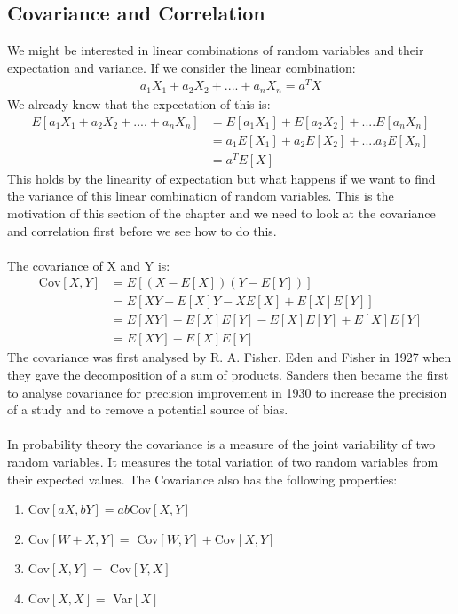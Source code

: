 \documentclass[,oneside]{article}
\begin{document}
\begin{enumerate}
\subsection{Covariance and Correlation}
We might be interested in linear combinations of random variables and their expectation and variance. If we consider the linear combination:
\begin{align*}
a_1 X_1 + a_2 X_2 +....+a_n X_n = a^T X
\end{align*}
We already know that the expectation of this is:
\begin{align*}
E[a_1 X_1 + a_2 X_2 +....+a_n X_n ]&=E[a_1 X_1]+E[a_2 X_2]+....E[a_n X_n]\\
&=a_1 E[X_1]+a_2 E[X_2]+....a_3 E[X_n]\\
&= a^T E[X]
\end{align*}
This holds by the linearity of expectation but what happens if we want to find the variance of this linear combination of random variables. This is the motivation of this section of the chapter and we need to look at the covariance and correlation first before we see how to do this.\\ \\
The covariance of X and Y is:
\begin{align*}
\text{Cov}[X, Y]&=E[(X-E[X])(Y-E[Y])]\\
&=E[XY-E[X]Y-XE[X]+E[X]E[Y]]\\
&=E[XY]-E[X]E[Y]-E[X]E[Y]+E[X]E[Y]\\
&=E[XY]-E[X]E[Y]
\end{align*}
The covariance was first analysed by R. A. Fisher. Eden and Fisher in 1927 when they gave the decomposition of a sum of products. Sanders then became the first to analyse covariance for precision improvement in 1930 to increase the precision of a study and to remove a potential source of bias.\\ \\
In probability theory the covariance is a measure of the joint variability of two random variables. It measures the total variation of two random variables from their expected values. The Covariance also has the following properties:\\
\begin{enumerate}
\item Cov$[aX,bY]=ab$Cov$[X,Y]$
\item Cov$[W+X,Y]=$ Cov$[W,Y]+$Cov$[X,Y]$
\item Cov$[X,Y]=$ Cov$[Y,X]$
\item Cov$[X,X]=$ Var$[X]$

\end{enumerate}
\end{enumerate}
\end{document}
